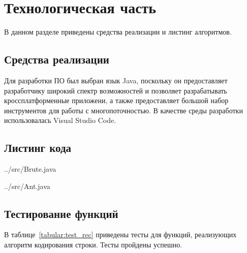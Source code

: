 \chapter{Технологическая часть}

В данном разделе приведены средства реализации и листинг алгоритмов.

\section{Средства реализации}

Для разработки ПО был выбран язык Java, поскольку он предоставляет разработчику широкий спектр возможностей и позволяет разрабатывать кроссплатформенные приложени, а также предоставляет большой набор инструментов для работы с многопоточностью. В качестве среды разработки использовалась Visual Studio Code. \cite{code}

\section{Листинг кода}


\begin{lstinputlisting}[
	caption={Реализация алгоритма полного перебора},
	label={lst:first},
	style={javalang},
	linerange={6-48}
]{../src/Brute.java}
\end{lstinputlisting}



\begin{lstinputlisting}[
	caption={Реализация муравьиного алгоритма},
	label={lst:second},
	style={javalang},
	linerange={9-173}
]{../src/Ant.java}
\end{lstinputlisting}


\section{Тестирование функций}

В таблице~\ref{tabular:test_rec} приведены тесты для функций, реализующих алгоритм кодирования строки. Тесты пройдены успешно.


